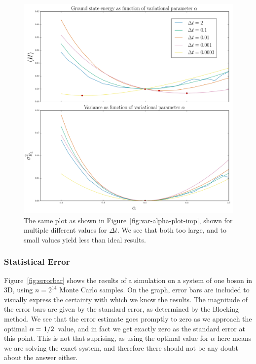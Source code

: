 \documentclass[twocolumn]{article}
\begin{document}
\begin{figure}[ht]
    \centering
    \includegraphics[width=0.9\linewidth]{../results/var-alpha-plot-imp-dts-10000.png}
    \caption{The same plot as shown in Figure~\ref{fig:var-alpha-plot-imp},
    shown for multiple different values for $\Delta t$. We see that both too
    large, and to small values yield less than ideal results.}
    \label{fig:var-alpha-plot-imp-dts}
\end{figure}

\subsubsection{Statistical Error}

Figure~\ref{fig:errorbar} shows the results of a simulation on a system of one
boson in 3D, using $n=2^{14}$ Monte Carlo samples. On the graph, error bars are
included to visually express the certainty with which we know the results. The
magnitude of the error bars are given by the standard error, as determined by
the Blocking method. We see that the error estimate goes promptly to zero as we
approach the optimal $\alpha=\flatfrac{1}{2}$ value, and in fact we get exactly
zero as the standard error at this point. This is not that suprising, as using
the optimal value for $\alpha$ here means we are solving the exact system, and
therefore there should not be any doubt about the answer either.
\end{document}
